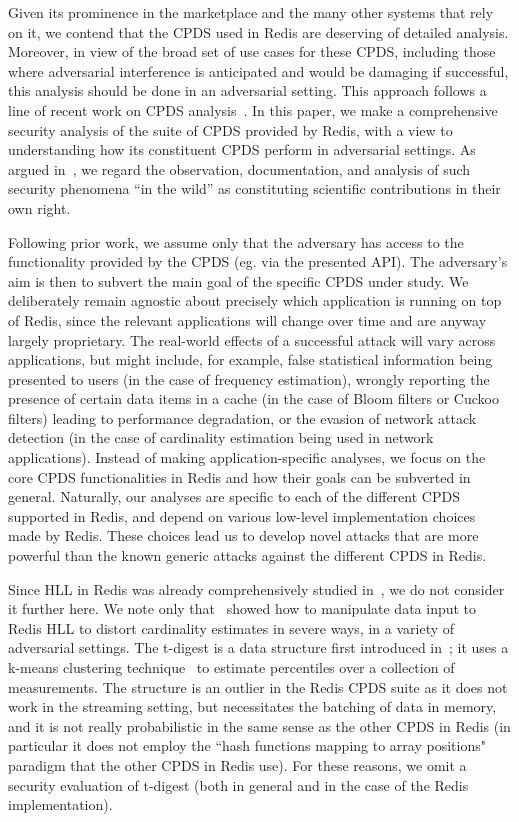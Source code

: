 Given its prominence in the marketplace and the many other systems that rely on it, we contend that the CPDS used in Redis are deserving of detailed analysis. Moreover, in view of the broad set of use cases for these CPDS, including those where adversarial interference is anticipated and would be damaging if successful, this analysis should be done in an adversarial setting. This approach follows a line of recent work on CPDS analysis~\cite{GerbetKL15,clayton2019,cardestprivacy,hllvuln,PatersonR22,markelon23}. In this paper, we make a comprehensive security analysis of the suite of CPDS provided by Redis, with a view to understanding how its constituent CPDS perform in adversarial settings. As argued in~\cite{cryptoeprint:2024/532}, we regard the observation, documentation, and analysis of such security phenomena ``in the wild'' as constituting scientific contributions in their own right.

Following prior work, we assume only that the adversary has access to the functionality provided by the CPDS (eg. via the presented API). The adversary's aim is then to subvert the main goal of the specific CPDS under study. 
We deliberately remain agnostic about precisely which application is running on top of Redis, since the relevant applications will change over time and are anyway largely proprietary. The real-world effects of a successful attack will vary across applications, but might include, for example, false statistical information being presented to users (in the case of frequency estimation), wrongly reporting the presence of certain data items in a cache (in the case of Bloom filters or Cuckoo filters) leading to performance degradation, or the evasion of network attack detection (in the case of cardinality estimation being used in network applications). 
Instead of making application-specific analyses, we focus on the core CPDS functionalities in Redis and how their goals can be subverted in general. Naturally, our analyses are specific to each of the different CPDS supported in Redis, and depend on various low-level implementation choices made by Redis. These choices lead us to develop novel attacks that are more powerful than the known generic attacks against the different CPDS in Redis.

Since HLL in Redis was already comprehensively studied in~\cite{PatersonR22}, we do not consider it further here. We note only that~\cite{PatersonR22} showed how to manipulate data input to Redis HLL to distort cardinality estimates in severe ways, in a variety of adversarial settings. The t-digest is a data structure first introduced in~\cite{dunning2021t}; it uses a k-means clustering technique~\cite{kodinariya2013review} to estimate percentiles over a collection of measurements. The structure is an outlier in the Redis CPDS suite as it does not work in the streaming setting, but necessitates the batching of data in memory, and it is not really probabilistic in the same sense as the other CPDS in Redis (in particular it does not employ the ``hash functions mapping to array positions" paradigm that the other CPDS in Redis use). For these reasons, we omit a security evaluation of t-digest (both in general and in the case of the Redis implementation).

